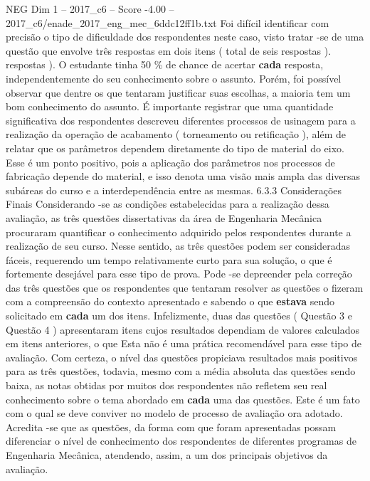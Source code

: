 \begin{textsample}{NEG Dim 1 – 2017\_c6 – Score -4.00 – 2017\_c6/enade\_2017\_eng\_mec\_6ddc12ff1b.txt}
Foi difícil identificar com precisão o tipo de dificuldade dos respondentes neste caso, visto tratar -se de uma questão que envolve três respostas em dois itens ( total de seis respostas ). respostas ).
O estudante tinha 50 \% de chance de acertar \textbf{cada} resposta, independentemente do seu conhecimento sobre o assunto.
Porém, foi possível observar que dentre os que tentaram justificar suas escolhas, a maioria tem um bom conhecimento do assunto.
É importante registrar que uma quantidade significativa dos respondentes descreveu diferentes processos de usinagem para a realização da operação de acabamento ( torneamento ou retificação ), além de relatar que os parâmetros dependem diretamente do tipo de material do eixo.
Esse é um ponto positivo, pois a aplicação dos parâmetros nos processos de fabricação depende do material, e isso denota uma visão mais ampla das diversas subáreas do curso e a interdependência entre as mesmas. 6.3.3 Considerações Finais Considerando -se as condições estabelecidas para a realização dessa avaliação, as três questões dissertativas da área de Engenharia Mecânica procuraram quantificar o conhecimento adquirido pelos respondentes durante a realização de seu curso.
Nesse sentido, as três questões podem ser consideradas fáceis, requerendo um tempo relativamente curto para sua solução, o que é fortemente desejável para esse tipo de prova.
Pode -se depreender pela correção das três questões que os respondentes que tentaram resolver as questões o fizeram com a compreensão do contexto apresentado e sabendo o que \textbf{estava} sendo solicitado em \textbf{cada} um dos itens.
Infelizmente, duas das questões ( Questão 3 e Questão 4 ) apresentaram itens cujos resultados dependiam de valores calculados em itens anteriores, o que Esta não é uma prática recomendável para esse tipo de avaliação.
Com certeza, o nível das questões propiciava resultados mais positivos para as três questões, todavia, mesmo com a média absoluta das questões sendo baixa, as notas obtidas por muitos dos respondentes não refletem seu real conhecimento sobre o tema abordado em \textbf{cada} uma das questões.
Este é um fato com o qual se deve conviver no modelo de processo de avaliação ora adotado.
Acredita -se que as questões, da forma com que foram apresentadas possam diferenciar o nível de conhecimento dos respondentes de diferentes programas de Engenharia Mecânica, atendendo, assim, a um dos principais objetivos da avaliação.

\end{textsample}
